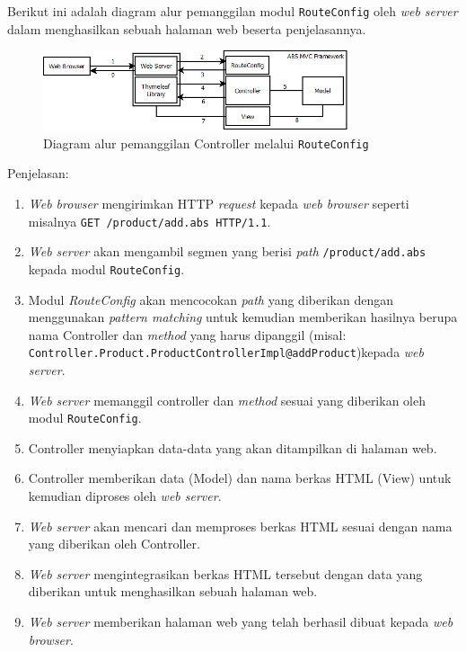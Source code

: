 Berikut ini adalah diagram alur pemanggilan modul \texttt{RouteConfig} oleh \textit{web server} dalam menghasilkan sebuah halaman web beserta penjelasannya.

\begin{figure}
    \centering
    \includegraphics[width=0.8\textwidth]{img/absmvc_flow.png}
    \caption{Diagram alur pemanggilan Controller melalui \texttt{RouteConfig}}
    \label{fig:diagramABSMVCRouteConfig}
\end{figure}

Penjelasan:
\begin{enumerate}
    \item \textit{Web browser} mengirimkan HTTP \textit{request} kepada \textit{web browser} seperti misalnya \texttt{GET /product/add.abs HTTP/1.1}.
    \item \textit{Web server} akan mengambil segmen yang berisi \textit{path} \texttt{/product/add.abs} kepada modul \texttt{RouteConfig}.
    \item Modul \textit{RouteConfig} akan mencocokan \textit{path} yang diberikan dengan menggunakan \textit{pattern matching} untuk kemudian memberikan hasilnya berupa nama Controller dan \textit{method} yang harus dipanggil (misal: \texttt{Controller.Product.ProductControllerImpl@addProduct})kepada \textit{web server}.
    \item \textit{Web server} memanggil controller dan \textit{method} sesuai yang diberikan oleh modul \texttt{RouteConfig}.
    \item Controller menyiapkan data-data yang akan ditampilkan di halaman web.
    \item Controller memberikan data (Model) dan nama berkas HTML (View) untuk kemudian diproses oleh \textit{web server}.
    \item \textit{Web server} akan mencari dan memproses berkas HTML sesuai dengan nama yang diberikan oleh Controller.
    \item \textit{Web server} mengintegrasikan berkas HTML tersebut dengan data yang diberikan untuk menghasilkan sebuah halaman web.
    \item \textit{Web server} memberikan halaman web yang telah berhasil dibuat kepada \textit{web browser}.
\end{enumerate}

